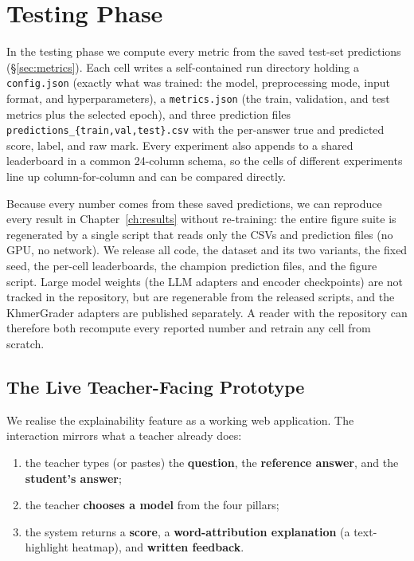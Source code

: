 \section{Testing Phase}
\label{sec:testing}
In the testing phase we compute every metric from the saved test-set predictions
(\S\ref{sec:metrics}). Each cell writes a self-contained run directory holding a \texttt{config.json}
(exactly what was trained: the model, preprocessing mode, input format, and hyperparameters), a
\texttt{metrics.json} (the train, validation, and test metrics plus the selected epoch), and three
prediction files \texttt{predictions\_\{train,val,test\}.csv} with the per-answer true and predicted
score, label, and raw mark. Every experiment also appends to a shared leaderboard in a common 24-column
schema, so the cells of different experiments line up column-for-column and can be compared directly.

Because every number comes from these saved predictions, we can reproduce every result in
Chapter~\ref{ch:results} without re-training: the entire figure suite is regenerated by a single script
that reads only the CSVs and prediction files (no GPU, no network). We release all code, the dataset and
its two variants, the fixed seed, the per-cell leaderboards, the champion
prediction files, and the figure script. Large model weights (the LLM adapters and encoder checkpoints)
are not tracked in the repository, but are regenerable from the released scripts, and the KhmerGrader
adapters are published separately. A reader with the repository can therefore both recompute every
reported number and retrain any cell from scratch.

\subsection{The Live Teacher-Facing Prototype}
\label{sec:prototype}
We realise the explainability feature as a working web application. The interaction mirrors
what a teacher already does:

\begin{enumerate}[leftmargin=1.8em]
  \item the teacher types (or pastes) the \textbf{question}, the \textbf{reference answer}, and the
  \textbf{student's answer};
  \item the teacher \textbf{chooses a model} from the four pillars;
  \item the system returns a \textbf{score}, a \textbf{word-attribution explanation} (a text-highlight
  heatmap), and \textbf{written feedback}.
\end{enumerate}

